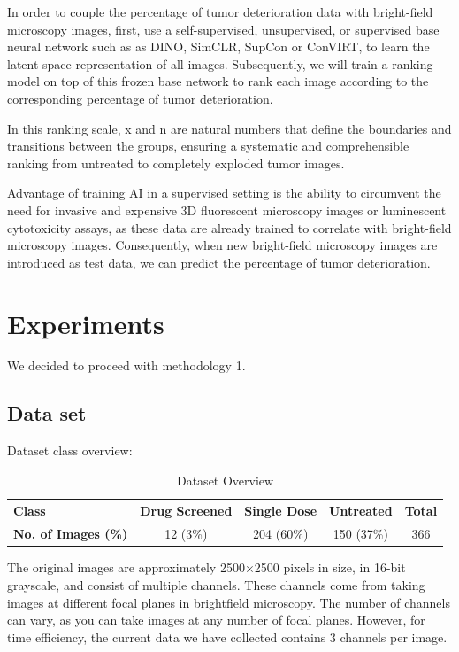 \documentclass[12pt,twoside,a4paper,parskip]{scrbook} %
\begin{document}
In order to couple the  percentage of tumor deterioration data with bright-field microscopy images, first, use a self-supervised, unsupervised, or supervised base neural network such as as DINO\cite{caron2021emerging}, SimCLR\cite{chen2020simple}, SupCon\cite{khosla2021supervised} or ConVIRT\cite{zhang2022contrastive}, to learn the latent space representation of all images. Subsequently, we will train a ranking model on top of this frozen base network to rank each image according to the corresponding percentage of tumor deterioration. 


In this ranking scale, x and n are natural numbers that define the boundaries and transitions between the groups, ensuring a systematic and comprehensible ranking from untreated to completely exploded tumor images.

Advantage of training AI in a supervised setting is the ability to circumvent the need for invasive and expensive 3D fluorescent microscopy images or luminescent cytotoxicity assays, as these data are already trained to correlate with bright-field microscopy images. Consequently, when new bright-field microscopy images are introduced as test data, we can predict the percentage of tumor deterioration.

\chapter{Experiments}\label{ch:Experiments}
We decided to proceed with methodology 1.
\section{Data set}
\label{sec:Data set}
Dataset class overview:
\begin{table}[ht!]
  \centering
  \begin{tabular}{|l|c|c|c|c|}
  \hline
  \textbf{Class} & \textbf{Drug Screened} & \textbf{Single Dose} & \textbf{Untreated} & \textbf{Total} \\ \hline
  \textbf{No. of Images (\%)}  & 12 (3\%) & 204 (60\%) & 150 (37\%) & 366 \\ \hline
  \end{tabular}
  \caption{Dataset Overview}
  \label{tab:dataset}
\end{table}




The original images are approximately 2500×2500 pixels in size, in 16-bit grayscale, and consist of multiple channels. These channels come from taking images at different focal planes in brightfield microscopy. The number of channels can vary, as you can take images at any number of focal planes. However, for time efficiency, the current data we have collected contains 3 channels per image.
\end{document}
